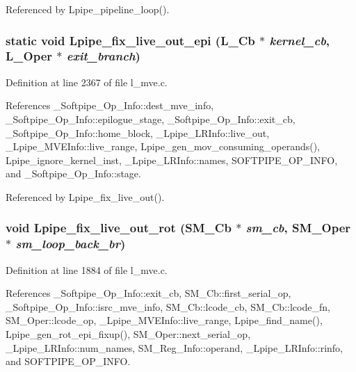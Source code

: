 Referenced by Lpipe\_\-pipeline\_\-loop().
\subsubsection{\setlength{\rightskip}{0pt plus 5cm}static void Lpipe\_\-fix\_\-live\_\-out\_\-epi (L\_\-Cb $\ast$ {\em kernel\_\-cb}, L\_\-Oper $\ast$ {\em exit\_\-branch})\hspace{0.3cm}{\tt  [static]}}\label{l__mve_8c_1ee5f471df4bc048477d40a2ab83bb47}




Definition at line 2367 of file l\_\-mve.c.

References \_\-Softpipe\_\-Op\_\-Info::dest\_\-mve\_\-info, \_\-Softpipe\_\-Op\_\-Info::epilogue\_\-stage, \_\-Softpipe\_\-Op\_\-Info::exit\_\-cb, \_\-Softpipe\_\-Op\_\-Info::home\_\-block, \_\-Lpipe\_\-LRInfo::live\_\-out, \_\-Lpipe\_\-MVEInfo::live\_\-range, Lpipe\_\-gen\_\-mov\_\-consuming\_\-operands(), Lpipe\_\-ignore\_\-kernel\_\-inst, \_\-Lpipe\_\-LRInfo::names, SOFTPIPE\_\-OP\_\-INFO, and \_\-Softpipe\_\-Op\_\-Info::stage.

Referenced by Lpipe\_\-fix\_\-live\_\-out().
\subsubsection{\setlength{\rightskip}{0pt plus 5cm}void Lpipe\_\-fix\_\-live\_\-out\_\-rot (\bf{SM\_\-Cb} $\ast$ {\em sm\_\-cb}, \bf{SM\_\-Oper} $\ast$ {\em sm\_\-loop\_\-back\_\-br})}\label{l__mve_8c_980d54700d750838e30a785314e34805}




Definition at line 1884 of file l\_\-mve.c.

References \_\-Softpipe\_\-Op\_\-Info::exit\_\-cb, SM\_\-Cb::first\_\-serial\_\-op, \_\-Softpipe\_\-Op\_\-Info::isrc\_\-mve\_\-info, SM\_\-Cb::lcode\_\-cb, SM\_\-Cb::lcode\_\-fn, SM\_\-Oper::lcode\_\-op, \_\-Lpipe\_\-MVEInfo::live\_\-range, Lpipe\_\-find\_\-name(), Lpipe\_\-gen\_\-rot\_\-epi\_\-fixup(), SM\_\-Oper::next\_\-serial\_\-op, \_\-Lpipe\_\-LRInfo::num\_\-names, SM\_\-Reg\_\-Info::operand, \_\-Lpipe\_\-LRInfo::rinfo, and SOFTPIPE\_\-OP\_\-INFO.

